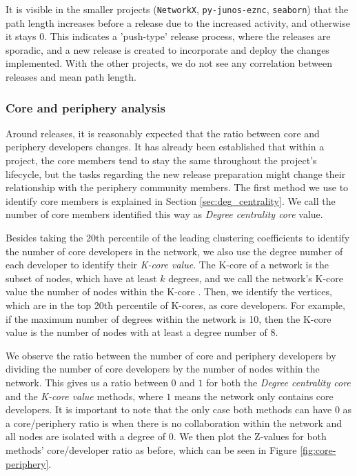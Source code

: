 It is visible in the smaller projects (\texttt{NetworkX}, \texttt{py-junos-eznc}, \texttt{seaborn}) that the path length increases before a release due to the increased activity, and otherwise it stays $0$. This indicates a 'push-type' release process, where the releases are sporadic, and a new release is created to incorporate and deploy the changes implemented. With the other projects, we do not see any correlation between releases and mean path length.

\subsubsection{Core and periphery analysis}

Around releases, it is reasonably expected that the ratio between core and periphery developers changes. It has already been established that within a project, the core members tend to stay the same throughout the project's lifecycle, but the tasks regarding the new release preparation might change their relationship with the periphery community members. The first method we use to identify core members is explained in Section \ref{sec:deg_centrality}. We call the number of core members identified this way as \textit{Degree centrality core} value. 

Besides taking the 20th percentile of the leading clustering coefficients to identify the number of core developers in the network, we also use the degree number of each developer to identify their \textit{K-core value}. The K-core of a network is the subset of nodes, which have at least $k$ degrees, and we call the network's K-core value the number of nodes within the K-core \cite{batageljAlgorithmCoresDecomposition2003}. Then, we identify the vertices, which are in the top 20th percentile of K-cores, as core developers. For example, if the maximum number of degrees within the network is 10, then the K-core value is the number of nodes with at least a degree number of 8.

We observe the ratio between the number of core and periphery developers by dividing the number of core developers by the number of nodes within the network. This gives us a ratio between $0$ and $1$ for both the \textit{Degree centrality core} and the \textit{K-core value} methods, where $1$ means the network only contains core developers. It is important to note that the only case both methods can have $0$ as a core/periphery ratio is when there is no collaboration within the network and all nodes are isolated with a degree of $0$. We then plot the Z-values for both methods' core/developer ratio as before, which can be seen in Figure \ref{fig:core-periphery}.


